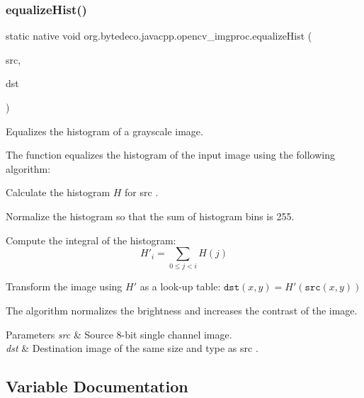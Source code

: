 \subsubsection{\texorpdfstring{equalize\+Hist()}{equalizeHist()}}
{\footnotesize\ttfamily static native void org.\+bytedeco.\+javacpp.\+opencv\+\_\+imgproc.\+equalize\+Hist (\begin{DoxyParamCaption}\item[{@By\+Val Mat}]{src,  }\item[{@By\+Val Mat}]{dst }\end{DoxyParamCaption})\hspace{0.3cm}{\ttfamily [static]}}



Equalizes the histogram of a grayscale image. 

The function equalizes the histogram of the input image using the following algorithm\+: 


\begin{DoxyItemize}
\item Calculate the histogram $H$ for src .
\item Normalize the histogram so that the sum of histogram bins is 255.
\item Compute the integral of the histogram\+: \[H'_i = \sum _{0 \le j < i} H(j)\]
\item Transform the image using $H'$ as a look-\/up table\+: $\texttt{dst}(x,y) = H'(\texttt{src}(x,y))$ 
\end{DoxyItemize}

The algorithm normalizes the brightness and increases the contrast of the image. 


\begin{DoxyParams}{Parameters}
{\em src} & Source 8-\/bit single channel image. \\
\hline
{\em dst} & Destination image of the same size and type as src . \\
\hline
\end{DoxyParams}


\subsection{Variable Documentation}
\mbox{\label{group__imgproc__hist_ga191607eeab47aa090f1b49b4e1198f6a}} 
